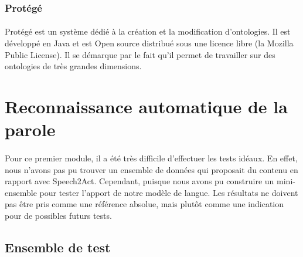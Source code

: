 		\subsubsection*{Protégé}
		\paragraph{}
		Protégé est un système dédié à la création et la modification d'ontologies. Il est développé en Java et est Open source distribué sous une licence libre (la Mozilla Public License). Il se démarque par le fait qu'il permet de travailler sur des ontologies de très grandes dimensions.
		
		
\section{Reconnaissance automatique de la parole}
\paragraph{}
Pour ce premier module, il a été très difficile d'effectuer les tests idéaux. En effet, nous n'avons pas pu trouver un ensemble de données qui proposait du contenu en rapport avec Speech2Act. Cependant, puisque nous avons pu construire un mini-ensemble pour tester l'apport de notre modèle de langue. Les résultats ne doivent pas être pris comme une référence absolue, mais plutôt comme une indication pour de possibles futurs tests.
	\subsection{Ensemble de test}
